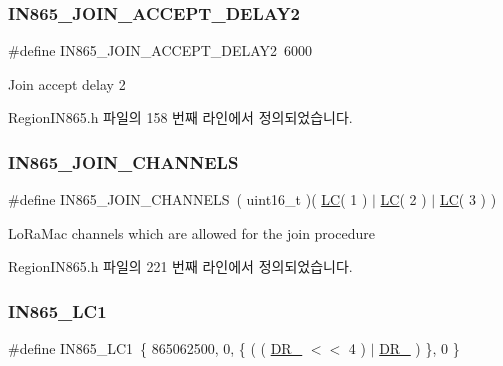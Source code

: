 \subsubsection{\texorpdfstring{I\+N865\+\_\+\+J\+O\+I\+N\+\_\+\+A\+C\+C\+E\+P\+T\+\_\+\+D\+E\+L\+A\+Y2}{IN865\_JOIN\_ACCEPT\_DELAY2}}
{\footnotesize\ttfamily \#define I\+N865\+\_\+\+J\+O\+I\+N\+\_\+\+A\+C\+C\+E\+P\+T\+\_\+\+D\+E\+L\+A\+Y2~6000}

Join accept delay 2 

Region\+I\+N865.\+h 파일의 158 번째 라인에서 정의되었습니다.

\mbox{\label{group___r_e_g_i_o_n_i_n865_ga61dadd0a86c40e6fd4d47ffb08a1305e}} 
\subsubsection{\texorpdfstring{I\+N865\+\_\+\+J\+O\+I\+N\+\_\+\+C\+H\+A\+N\+N\+E\+LS}{IN865\_JOIN\_CHANNELS}}
{\footnotesize\ttfamily \#define I\+N865\+\_\+\+J\+O\+I\+N\+\_\+\+C\+H\+A\+N\+N\+E\+LS~( uint16\+\_\+t )( \mbox{\hyperlink{group___r_e_g_i_o_n_ga12fa17e5c1016e01a9d82c25027deb1b}{LC}}( 1 ) $\vert$ \mbox{\hyperlink{group___r_e_g_i_o_n_ga12fa17e5c1016e01a9d82c25027deb1b}{LC}}( 2 ) $\vert$ \mbox{\hyperlink{group___r_e_g_i_o_n_ga12fa17e5c1016e01a9d82c25027deb1b}{LC}}( 3 ) )}

Lo\+Ra\+Mac channels which are allowed for the join procedure 

Region\+I\+N865.\+h 파일의 221 번째 라인에서 정의되었습니다.

\mbox{\label{group___r_e_g_i_o_n_i_n865_gab2e4ff59116b5b7ea17b56379b9b1fbc}} 
\subsubsection{\texorpdfstring{I\+N865\+\_\+\+L\+C1}{IN865\_LC1}}
{\footnotesize\ttfamily \#define I\+N865\+\_\+\+L\+C1~\{ 865062500, 0, \{ ( ( \mbox{\hyperlink{group___r_e_g_i_o_n_ga872e12c82020c02a7f70a1c6ed1375df}{D\+R\+\_}} $<$$<$ 4 ) $\vert$ \mbox{\hyperlink{group___r_e_g_i_o_n_ga6c4ef966b4f3d5eb7597b087f2b97095}{D\+R\+\_}} ) \}, 0 \}}

